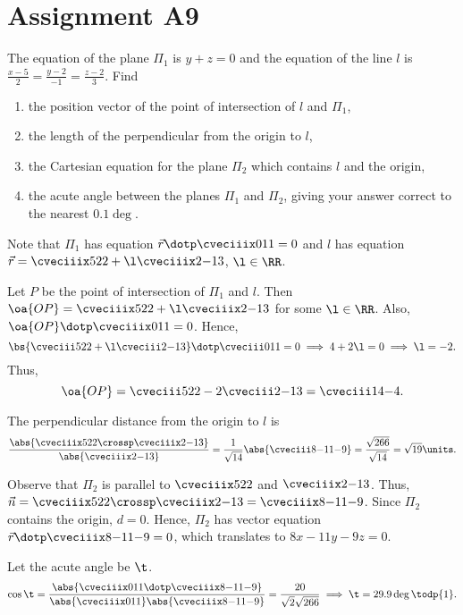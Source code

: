 \section{Assignment A9}

\begin{problem}
    The equation of the plane $\Pi_1$ is $y + z = 0$ and the equation of the line $l$ is $\frac{x-5}2 = \frac{y-2}{-1} = \frac{z-2}3$. Find
    \begin{enumerate}
        \item the position vector of the point of intersection of $l$ and $\Pi_1$,
        \item the length of the perpendicular from the origin to $l$,
        \item the Cartesian equation for the plane $\Pi_2$ which contains $l$ and the origin,
        \item the acute angle between the planes $\Pi_1$ and $\Pi_2$, giving your answer correct to the nearest $0.1 \deg$.
    \end{enumerate}
\end{problem}
\begin{solution}
    Note that $\Pi_1$ has equation $\vec r \dotp \cveciiix011 = 0$ and $l$ has equation $\vec r = \cveciiix522 + \l \cveciiix2{-1}3$, $\l \in \RR$.

    \begin{ppart}
        Let $P$ be the point of intersection of $\Pi_1$ and $l$. Then $\oa{OP} = \cveciiix522 + \l \cveciiix2{-1}3$ for some $\l \in \RR$. Also, $\oa{OP} \dotp \cveciiix011 = 0$. Hence, \[\bs{\cveciii522 + \l \cveciii2{-1}3} \dotp \cveciii011 = 0 \implies 4 + 2\l = 0 \implies \l = -2.\] Thus, \[\oa{OP} = \cveciii522 - 2\cveciii2{-1}3 = \cveciii14{-4}.\]
    \end{ppart}
    \begin{ppart}
        The perpendicular distance from the origin to $l$ is \[\frac{\abs{\cveciiix522 \crossp \cveciiix2{-1}3}}{\abs{\cveciiix2{-1}3}} = \frac1{\sqrt{14}} \abs{\cveciii8{-11}{-9}} = \frac{\sqrt{266}}{\sqrt{14}} = \sqrt{19} \units.\]
    \end{ppart}
    \begin{ppart}
        Observe that $\Pi_2$ is parallel to $\cveciiix522$ and $\cveciiix2{-1}3$. Thus, $\vec n = \cveciiix522 \crossp \cveciiix2{-1}3 = \cveciiix8{-11}{-9}$. Since $\Pi_2$ contains the origin, $d = 0$. Hence, $\Pi_2$ has vector equation $\vec r \dotp \cveciiix8{-11}{-9} = 0$, which translates to $8x - 11y - 9z = 0$.
    \end{ppart}
    \begin{ppart}
        Let the acute angle be $\t$. \[\cos\t = \frac{\abs{\cveciiix011 \dotp \cveciiix8{-11}{-9}}}{\abs{\cveciiix011}\abs{\cveciiix8{-11}{-9}}} = \frac{20}{\sqrt{2}\sqrt{266}} \implies \t = 29.9\deg \todp{1}.\]
    \end{ppart}
\end{solution}

